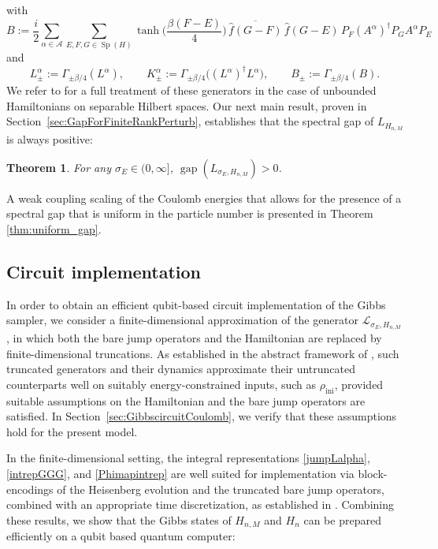 \documentclass[11pt]{amsart}
\newcommand{\1}{\mathbbm{1}}
\newcommand{\cL}{\mathcal{L}}
\theoremstyle{plain}
\newtheorem{theorem}{Theorem}[section]
\theoremstyle{definition}
\theoremstyle{remark}
\numberwithin{equation}{section}
\begin{document}
with 
\[
B:=\frac{i}{2}\sum_{\alpha\in\mathcal A}\sum_{E,F,G\in\operatorname{Sp}(H)}
\tanh\!\Big(\frac{\beta(F-E)}{4}\Big)\,
\overline{\widehat f(G-F)}\,\widehat f(G-E)\,
P_{F}(A^\alpha)^\dagger P_GA^\alpha P_E
\]
and
\[
L^\alpha_\pm:=\Gamma_{\pm\beta/4}(L^\alpha),
\qquad
K^\alpha_\pm:=\Gamma_{\pm\beta/4}\big((L^\alpha)^\dagger L^\alpha\big),\qquad B_\pm:=\Gamma_{\pm\beta/4}(B).
\] 
We refer to \cite{BeckerRouzeSalzmannToAppearcmp} for a full treatment of these generators in the case of unbounded Hamiltonians on separable Hilbert spaces. Our next main result, proven in Section~\ref{sec:GapForFiniteRankPerturb}, establishes that the spectral gap of $L_{H_{n,M}}$ is always positive:
\begin{theorem}\label{mainthmpositivegap}
For any $\sigma_E\in (0,\infty]$, $\operatorname{gap}(L_{\sigma_E,H_{n,M}})>0$.
\end{theorem}

A weak coupling scaling of the Coulomb energies that allows for the presence of a spectral gap that is uniform in the particle number is presented in Theorem \ref{thm:uniform_gap}.





\subsection{Circuit implementation}


\noindent In order to obtain an efficient qubit-based circuit implementation of the Gibbs sampler, we consider a finite-dimensional approximation of the generator $\cL_{\sigma_E,H_{n,M}}$, in which both the bare jump operators and the Hamiltonian are replaced by finite-dimensional truncations. As established in the abstract framework of \cite{BeckerRouzeSalzmannToAppearcmp}, such truncated generators and their dynamics approximate their untruncated counterparts well on suitably energy-constrained inputs, such as $\rho_{\operatorname{ini}}$, provided suitable assumptions on the Hamiltonian and the bare jump operators are satisfied. In Section~\ref{sec:GibbscircuitCoulomb}, we verify that these assumptions hold for the present model.

In the finite-dimensional setting, the integral representations \eqref{jumpLalpha}, \eqref{intrepGGG}, and \eqref{Phimapintrep} are well suited for implementation via block-encodings of the Heisenberg evolution and the truncated bare jump operators, combined with an appropriate time discretization, as established in \cite{chen2023efficient,ding2025efficient}. Combining these results, we show that the Gibbs states of $H_{n,M}$ and $H_n$ can be prepared efficiently on a qubit based quantum computer:
\end{document}
